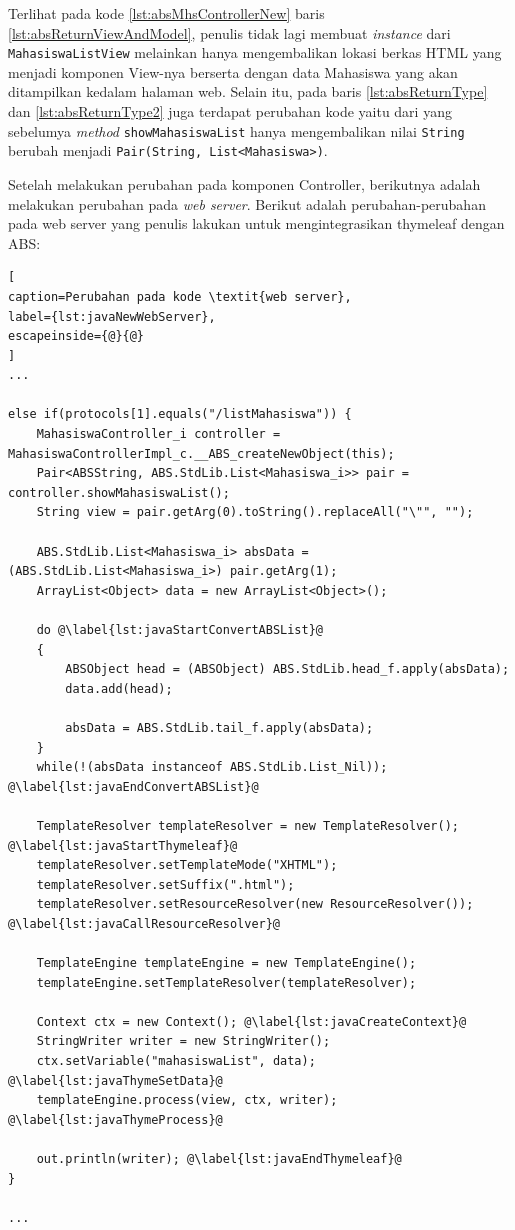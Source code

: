 Terlihat pada kode \ref{lst:absMhsControllerNew} baris \ref{lst:absReturnViewAndModel}, penulis tidak lagi membuat \textit{instance} dari \texttt{MahasiswaListView} melainkan hanya mengembalikan lokasi berkas HTML yang menjadi komponen View-nya berserta dengan data Mahasiswa yang akan ditampilkan kedalam halaman web. Selain itu, pada baris \ref{lst:absReturnType} dan \ref{lst:absReturnType2} juga terdapat perubahan kode yaitu dari yang sebelumya \textit{method} \texttt{showMahasiswaList} hanya mengembalikan nilai \texttt{String} berubah menjadi \texttt{Pair(String, List<Mahasiswa>)}.

Setelah melakukan perubahan pada komponen Controller, berikutnya adalah melakukan perubahan pada \textit{web server}. Berikut adalah perubahan-perubahan pada web server yang penulis lakukan untuk mengintegrasikan thymeleaf dengan ABS:

\begin{lstlisting}[
caption=Perubahan pada kode \textit{web server},
label={lst:javaNewWebServer},
escapeinside={@}{@}
]
...

else if(protocols[1].equals("/listMahasiswa")) {
   	MahasiswaController_i controller = MahasiswaControllerImpl_c.__ABS_createNewObject(this);
   	Pair<ABSString, ABS.StdLib.List<Mahasiswa_i>> pair = controller.showMahasiswaList();
   	String view = pair.getArg(0).toString().replaceAll("\"", "");
   	
   	ABS.StdLib.List<Mahasiswa_i> absData = (ABS.StdLib.List<Mahasiswa_i>) pair.getArg(1);
   	ArrayList<Object> data = new ArrayList<Object>();
           		
	do @\label{lst:javaStartConvertABSList}@
	{
		ABSObject head = (ABSObject) ABS.StdLib.head_f.apply(absData);
		data.add(head);
		
		absData = ABS.StdLib.tail_f.apply(absData);
	}
	while(!(absData instanceof ABS.StdLib.List_Nil)); @\label{lst:javaEndConvertABSList}@
	
	TemplateResolver templateResolver = new TemplateResolver(); @\label{lst:javaStartThymeleaf}@
    templateResolver.setTemplateMode("XHTML");
    templateResolver.setSuffix(".html");
    templateResolver.setResourceResolver(new ResourceResolver()); @\label{lst:javaCallResourceResolver}@
                
    TemplateEngine templateEngine = new TemplateEngine();
    templateEngine.setTemplateResolver(templateResolver);
                
	Context ctx = new Context(); @\label{lst:javaCreateContext}@
	StringWriter writer = new StringWriter();
	ctx.setVariable("mahasiswaList", data); @\label{lst:javaThymeSetData}@
	templateEngine.process(view, ctx, writer); @\label{lst:javaThymeProcess}@
	
	out.println(writer); @\label{lst:javaEndThymeleaf}@
}

...
\end{lstlisting}

